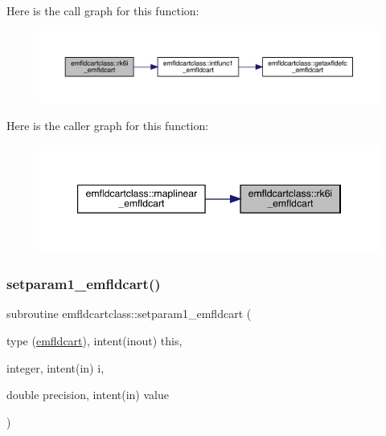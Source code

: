 Here is the call graph for this function\+:\nopagebreak
\begin{figure}[H]
\begin{center}
\leavevmode
\includegraphics[width=350pt]{namespaceemfldcartclass_a2d6f42bcd880ec225920c8179e292af6_cgraph}
\end{center}
\end{figure}
Here is the caller graph for this function\+:\nopagebreak
\begin{figure}[H]
\begin{center}
\leavevmode
\includegraphics[width=347pt]{namespaceemfldcartclass_a2d6f42bcd880ec225920c8179e292af6_icgraph}
\end{center}
\end{figure}
\mbox{\label{namespaceemfldcartclass_a667f3b95239a56c59438d7645e902471}} 
\subsubsection{\texorpdfstring{setparam1\_emfldcart()}{setparam1\_emfldcart()}}
{\footnotesize\ttfamily subroutine emfldcartclass\+::setparam1\+\_\+emfldcart (\begin{DoxyParamCaption}\item[{type (\mbox{\hyperlink{namespaceemfldcartclass_structemfldcartclass_1_1emfldcart}{emfldcart}}), intent(inout)}]{this,  }\item[{integer, intent(in)}]{i,  }\item[{double precision, intent(in)}]{value }\end{DoxyParamCaption})}

